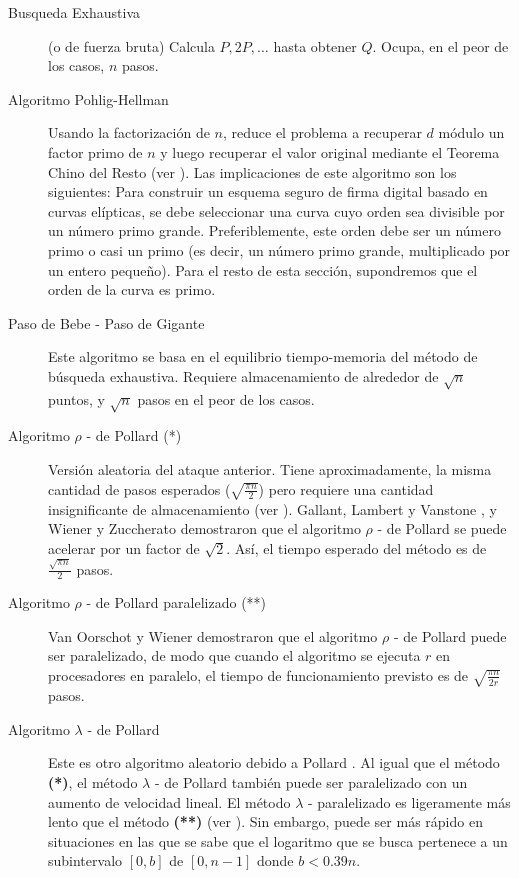 \documentclass[11pt]{article}
\numberwithin{equation}{section} %
\numberwithin{figure}{section} %
\numberwithin{table}{section} %
\begin{document}
		\begin{description}

			\item[Busqueda Exhaustiva](o de fuerza bruta) Calcula $P,2P,\ldots$ hasta obtener $Q$. Ocupa, en el peor de los casos, $n$ pasos.

			\item[Algoritmo Pohlig-Hellman] Usando la factorización de $n$, reduce el problema a recuperar $d$ módulo un factor primo de $n$ y luego recuperar el valor original mediante el Teorema Chino del Resto (ver \cite{PH}). Las implicaciones de este algoritmo son los siguientes: Para construir un esquema seguro de firma digital basado en curvas elípticas, se debe seleccionar una curva cuyo orden sea divisible por un número primo grande. Preferiblemente, este orden debe ser un número primo o casi un primo (es decir, un número primo grande, multiplicado por un entero pequeño). Para el resto de esta sección, supondremos que el orden de la curva es primo.

			\item[Paso de Bebe - Paso de Gigante] Este algoritmo se basa en el equilibrio tiempo-memoria del método de búsqueda exhaustiva. Requiere almacenamiento de alrededor de $\sqrt{n}$ puntos, y $\sqrt{n}$ pasos en el peor de los casos.

			\item[Algoritmo $\rho$ - de Pollard (*)]\label{rhodeP} Versión aleatoria del ataque anterior. Tiene aproximadamente, la misma cantidad de pasos esperados ($\sqrt{\frac{\pi n}{2}}$)  pero requiere una cantidad insignificante de almacenamiento (ver \cite{Pol78}). Gallant, Lambert y Vanstone \cite{GLV}, y Wiener y Zuccherato \cite{WZ} demostraron que el algoritmo $\rho$ - de Pollard se puede acelerar por un factor de $\sqrt{2}$. Así, el tiempo esperado del método  es de $\frac{\sqrt{\pi n}}{2}$ pasos.

			\item[Algoritmo $\rho$ - de Pollard paralelizado (**)]\label{rhodePp} Van Oorschot y Wiener \cite{VW} demostraron que el algoritmo $\rho$ - de Pollard puede ser paralelizado, de modo que cuando el algoritmo se ejecuta $r$ en procesadores en paralelo, el tiempo de funcionamiento previsto es de $\sqrt{\frac{\pi n}{2r}}$ pasos.
     
\item[Algoritmo $\lambda$ - de Pollard] Este es otro algoritmo aleatorio debido a Pollard \cite{PH}. Al igual que el método \textbf{(*)}, el método $\lambda$ - de Pollard también puede ser paralelizado con un aumento de velocidad lineal. El método $\lambda$ - paralelizado es ligeramente más lento que el método \textbf{(**)} (ver \cite{PH}). Sin embargo, puede ser más rápido en situaciones en las que se sabe que el logaritmo que se busca pertenece a un subintervalo $\left[ 0,b\right]$ de $\left[0,n-1\right]$ donde $b<0.39n$.


\end{description}
\end{document}
